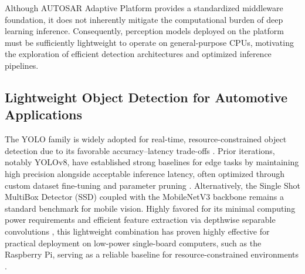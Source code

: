Although AUTOSAR Adaptive Platform provides a standardized middleware foundation, it does not inherently mitigate the computational burden of deep learning inference. Consequently, perception models deployed on the platform must be sufficiently lightweight to operate on general-purpose CPUs, motivating the exploration of efficient detection architectures and optimized inference pipelines.

\subsection{Lightweight Object Detection for Automotive Applications}


The YOLO family is widely adopted for real-time, resource-constrained object detection due to its favorable accuracy--latency trade-offs \cite{redmon_2016_you}\cite{ali_2024_the}\cite{11015428}\cite{10254054}. Prior iterations, notably YOLOv8, have established strong baselines for edge tasks by maintaining high precision alongside acceptable inference latency, often optimized through custom dataset fine-tuning and parameter pruning \cite{yolov8_10594419}\cite{yolov8_10374650}. Alternatively, the Single Shot MultiBox Detector (SSD) coupled with the MobileNetV3 backbone remains a standard benchmark for mobile vision. Highly favored for its minimal computing power requirements and efficient feature extraction via depthwise separable convolutions \cite{ssd_9824392}\cite{ssd_10303636}, this lightweight combination has proven highly effective for practical deployment on low-power single-board computers, such as the Raspberry Pi, serving as a reliable baseline for resource-constrained environments \cite{ssd_10303636}.

